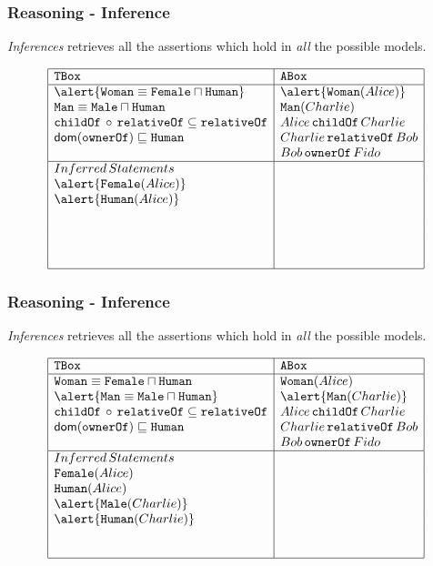 \documentclass[8pt]{beamer}
\newcommand{\TBox}{{\tt TBox}}
\newcommand{\ABox}{{\tt ABox}}
\newcommand{\Human}{\mathtt{Human}}
\newcommand{\Male}{\mathtt{Male}}
\newcommand{\Female}{\mathtt{Female}}
\newcommand{\Man}{\mathtt{Man}}
\newcommand{\Woman}{\mathtt{Woman}}
\newcommand{\relative}{\mathtt{relativeOf}}
\newcommand{\child}{\mathtt{childOf}}
\newcommand{\owner}{\mathtt{ownerOf}}
\newcommand{\Alice}{Alice}
\newcommand{\Bob}{Bob}
\newcommand{\Charlie}{Charlie}
\newcommand{\Fido}{Fido}
\begin{document}
\begin{frame}
 \frametitle{Reasoning - Inference}

 \emph{Inferences} retrieves all the assertions which hold in \emph{all} the possible models.
 
 \[
  \begin{array}{|l|l|}
   \hline
   \TBox & \ABox\\
   \hline
   \alert{\Woman \equiv \Female \sqcap \Human} & \alert{\Woman(\Alice)}\\
   \Man \equiv \Male \sqcap \Human & \Man(\Charlie)\\
   \child\,\circ\,\relative \subseteq \relative &  \Alice\,\child\,\Charlie\\
   \dom(\owner) \Issub \Human & \Charlie\,\relative\,\Bob\\
   & \Bob\,\owner\,\Fido\\
   \hline
   Inferred\,Statements & \\
   \alert{\Female(\Alice)}& \\
   \alert{\Human(\Alice)}& \\
   \phantom{\Male(\Charlie)} & \\
   \phantom{\Human(\Charlie)} & \\
   \phantom{\Alice\,\relative\,\Bob} & \\
   \phantom{\Human(\Bob)} & \\
   \hline
  \end{array}
 \]
\end{frame}

\begin{frame}
 \frametitle{Reasoning - Inference}

 \emph{Inferences} retrieves all the assertions which hold in \emph{all} the possible models.
 
 \[
  \begin{array}{|l|l|}
   \hline
   \TBox & \ABox\\
   \hline
   \Woman \equiv \Female \sqcap \Human & \Woman(\Alice)\\
   \alert{\Man \equiv \Male \sqcap \Human} & \alert{\Man(\Charlie)}\\
   \child\,\circ\,\relative \subseteq \relative &  \Alice\,\child\,\Charlie\\
   \dom(\owner) \Issub \Human & \Charlie\,\relative\,\Bob\\
   & \Bob\,\owner\,\Fido\\
   \hline
   Inferred\,Statements & \\
   \Female(\Alice)& \\
   \Human(\Alice)& \\
   \alert{\Male(\Charlie)} & \\
   \alert{\Human(\Charlie)} & \\
   \phantom{\Alice\,\relative\,\Bob} & \\
   \phantom{\Human(\Bob)} & \\
   \hline
  \end{array}
 \]
\end{frame}
\end{document}
